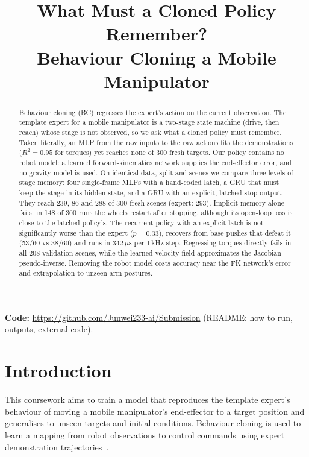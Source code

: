 \documentclass[conference]{IEEEtran}
\begin{document}
\title{What Must a Cloned Policy Remember?\\ Behaviour Cloning a Mobile Manipulator}

\author{
\and
{}
\and
{}
}

\maketitle

\begin{abstract}
Behaviour cloning (BC) regresses the expert's action on the current observation. The template expert
for a mobile manipulator is a two-stage state machine (drive, then reach) whose stage is not observed,
so we ask what a cloned policy must remember. Taken literally, an MLP from the raw inputs to the raw
actions fits the demonstrations ($R^2=0.95$ for torques) yet reaches none of 300 fresh targets. Our
policy contains no robot model: a learned forward-kinematics network supplies the end-effector error,
and no gravity model is used. On identical data, split and scenes we compare three levels of stage
memory: four single-frame MLPs with a hand-coded latch, a GRU that must keep the stage in its hidden
state, and a GRU with an explicit, latched stop output. They reach 239, 86 and 288 of 300 fresh scenes
(expert: 293). Implicit memory alone fails: in 148 of 300 runs the wheels restart after stopping, although
its open-loop loss is close to the latched policy's. The recurrent policy with an explicit latch is not
significantly worse than the expert ($p=0.33$), recovers from base pushes that defeat it (53/60 vs 38/60)
and runs in 342\,$\mu$s per 1\,kHz step. Regressing torques directly fails in all 208 validation scenes, while
the learned velocity field approximates the Jacobian pseudo-inverse. Removing the robot model costs
accuracy near the FK network's error and extrapolation to unseen arm postures.
\end{abstract}

\noindent\textbf{Code:} \url{https://github.com/Junwei233-ai/Submission} (README: how to run, outputs, external code).

\section{Introduction}

This coursework aims to train a model that reproduces the template
expert's behaviour of moving a mobile manipulator's end-effector to a
target position and generalises to unseen targets and initial conditions.
Behaviour cloning is used to learn a mapping from robot observations
to control commands using expert demonstration
trajectories~\cite{pomerleau1989}.
\end{document}
